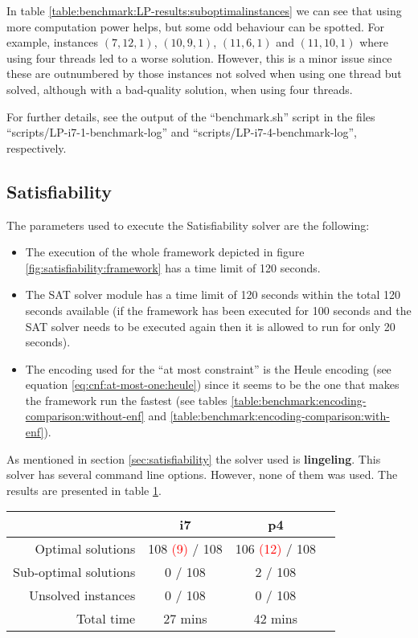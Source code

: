 In table \ref{table:benchmark:LP-results:suboptimalinstances} we can see that using more
computation power helps, but some odd behaviour can be spotted. For example,
instances $(7,12,1)$, $(10,9,1)$, $(11,6,1)$ and $(11,10,1)$  where using four
threads led to a worse solution. However, this is a minor issue since these are
outnumbered by those instances not solved when using one thread but solved,
although with a bad-quality solution, when using four threads.

\hfill

For further details, see the output of the ``benchmark.sh'' script in the files
``scripts/LP-i7-1-benchmark-log'' and ``scripts/LP-i7-4-benchmark-log'', respectively.

\subsection{Satisfiability}
\label{sec:benchmarking:satisfiability}

The parameters used to execute the Satisfiability solver are the following:
\begin{itemize}
	\item The execution of the whole framework depicted in figure \ref{fig:satisfiability:framework}
	has a time limit of 120 seconds.
	\item The SAT solver module has a time limit of 120 seconds within the total 120 seconds
	available (if the framework has been executed for 100 seconds and the SAT solver needs
	to be executed again then it is allowed to run for only 20 seconds).
	\item The encoding used for the ``at most constraint'' is the Heule encoding 
	(see equation \ref{eq:cnf:at-most-one:heule}) since it seems to be the one that makes the framework
	run the fastest (see tables \ref{table:benchmark:encoding-comparison:without-enf} and
	\ref{table:benchmark:encoding-comparison:with-enf}).
\end{itemize}

As mentioned in section \ref{sec:satisfiability} the solver used is \textbf{lingeling}\cite{lingeling}.
This solver has several command line options. However, none of them was used. The results
are presented in table \ref{table:benchmark:SAT-results}.

\begin{table}[H]
\centering
	\begin{tabular}{rccc}
								& i7 	& p4 \\
		\midrule
		Optimal solutions		& 108 \textcolor{red}{(9)} / 108
											& 106 \textcolor{red}{(12)} / 108 \\
		Sub-optimal solutions	& 0 / 108	& 2 / 108 \\
		Unsolved instances		& 0 / 108	& 0 / 108 \\
		Total time				& 27 mins	& 42 mins \\
	\end{tabular}
	\label{table:benchmark:SAT-results}
\end{table}

